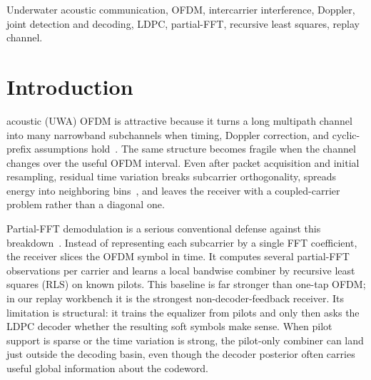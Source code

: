 \documentclass[journal]{IEEEtran}
\begin{document}
\begin{IEEEkeywords}
Underwater acoustic communication, OFDM, intercarrier interference, Doppler,
joint detection and decoding, LDPC, partial-FFT, recursive least squares,
replay channel.
\end{IEEEkeywords}

\section{Introduction}\label{sec:intro}
 acoustic (UWA) OFDM is attractive because it turns a
long multipath channel into many narrowband subchannels when timing, Doppler
correction, and cyclic-prefix assumptions hold~\cite{li2008nonuniform}. The same
structure becomes fragile when the channel changes over the useful OFDM
interval. Even after packet acquisition and initial resampling, residual
time variation breaks subcarrier orthogonality, spreads energy into neighboring
bins~\cite{berger2010sparse}, and leaves the receiver with a coupled-carrier
problem rather than a diagonal one.

Partial-FFT demodulation is a serious conventional defense against this
breakdown~\cite{yerramalli2012partialfft}. Instead of representing each
subcarrier by a single FFT coefficient, the receiver slices the OFDM symbol in
time. It computes several partial-FFT observations per carrier and learns a
local bandwise combiner by recursive least squares (RLS) on known pilots. This
baseline is far stronger than one-tap OFDM; in our
replay workbench it is the strongest non-decoder-feedback receiver. Its
limitation is structural: it trains the equalizer from pilots and only then asks
the LDPC decoder whether the resulting soft symbols make sense. When pilot
support is sparse or the time variation is strong, the pilot-only combiner can
land just outside the decoding basin, even though the decoder posterior often
carries useful global information about the codeword.
\end{document}
